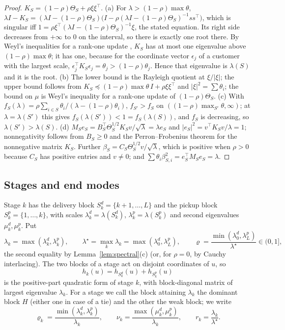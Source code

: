 \documentclass[pdflatex,sn-mathphys-ay]{sn-jnl}%
\theoremstyle{thmstyleone}%
\theoremstyle{thmstylethree}%
\theoremstyle{thmstyletwo}%
\begin{document}
\begin{proof}
$K_S=(1-\rho)\Theta_S+\rho \xi\xi^\top$. (a) For $\lambda>(1-\rho)\max\theta$,
$\lambda I-K_S=(\lambda I-(1-\rho)\Theta_S)\big(I-\rho(\lambda I-(1-\rho)\Theta_S)^{-1}ss^\top\big)$,
which is singular iff $1=\rho \xi^\top(\lambda I-(1-\rho)\Theta_S)^{-1}\xi$, the stated
equation. Its right side decreases from $+\infty$ to $0$ on the interval, so there is
exactly one root there. By Weyl's inequalities for a rank-one update
\citep[Thm.~4.3.4]{HornJohnson2013}, $K_S$ has at most one eigenvalue above
$(1-\rho)\max\theta$; it has one, because for the coordinate vector $\epsilon_j$ of a
customer with the largest scale, $\epsilon_j^\top K_S\epsilon_j=\theta_j>(1-\rho)\theta_j$.
Hence that eigenvalue is $\lambda(S)$ and it is the root.
(b) The lower bound is the Rayleigh quotient at $\xi/|\xi|$; the upper bound
follows from $K_S\preceq(1-\rho)\max\theta\,I+\rho \xi\xi^\top$ and $|\xi|^2=\sum\theta_i$;
the bound on $\mu$ is Weyl's inequality for a rank-one update of $(1-\rho)\Theta_S$.
(c) With $f_S(\lambda)=\rho\sum_{i\in S}\theta_i/(\lambda-(1-\rho)\theta_i)$, $f_{S'}>f_S$ on
$((1-\rho)\max_{S'}\theta,\infty)$; at $\lambda=\lambda(S')$ this gives
$f_S(\lambda(S'))<1=f_S(\lambda(S))$, and $f_S$ is decreasing, so $\lambda(S')>\lambda(S)$.
(d) $M_Se_S=B_S^\top\Theta_S^{1/2}K_Sv/\sqrt{\lambda}=\lambda e_S$ and
$|e_S|^2=v^\top K_Sv/\lambda=1$; nonnegativity follows from $B_S\ge0$ and the
Perron--Frobenius theorem for the nonnegative matrix $K_S$. Further
$\beta_S=C_S\Theta_S^{1/2}v/\sqrt\lambda$, which is positive when $\rho>0$ because $C_S$ has
positive entries and $v\ne0$; and
$\sum\theta_i\beta_{S,i}^2=e_S^\top M_Se_S=\lambda$.
\end{proof}

\subsection{Stages and end modes}
Stage $k$ has the delivery block $S^d_k=\{k+1,\dots,L\}$ and the pickup block
$S^p_k=\{1,\dots,k\}$, with scales $\lambda^d_k=\lambda(S^d_k)$, $\lambda^p_k=\lambda(S^p_k)$
and second eigenvalues $\mu^d_k,\mu^p_k$. Put
\[
\lambda_k=\max(\lambda^d_k,\lambda^p_k),\qquad
\lambda^\star=\max_k\lambda_k=\max(\lambda^d_0,\lambda^p_L),\qquad
\varrho=\frac{\min(\lambda^d_0,\lambda^p_L)}{\lambda^\star}\in(0,1],
\]
the second equality by Lemma~\ref{lem:spectral}(c) (or, for $\rho=0$, by Cauchy
interlacing). The two blocks of a stage act on disjoint coordinates of $u$, so
\[
h_k(u)=h_{S^d_k}(u)+h_{S^p_k}(u)
\]
is the positive-part quadratic form of stage $k$, with block-diagonal matrix of largest
eigenvalue $\lambda_k$. For a stage we call the block attaining $\lambda_k$ the dominant
block $H$ (either one in case of a tie) and the other the weak block; we write
\[
\varrho_k=\frac{\min(\lambda^d_k,\lambda^p_k)}{\lambda_k},\qquad
\nu_k=\frac{\max(\mu^d_k,\mu^p_k)}{\lambda_k},\qquad r_k=\frac{\lambda_k}{\lambda^\star}.
\]
\end{document}
